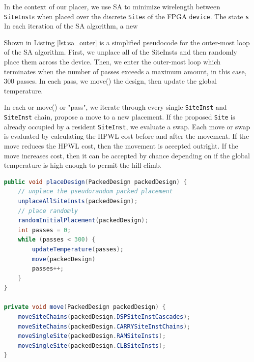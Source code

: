 %
%
%
%

In the context of our placer, we use SA to minimize wirelength between \texttt{SiteInst}s when placed over the discrete \texttt{Site}s of the FPGA \texttt{device}.
The state \texttt{s}
In each iteration of the SA algorithm, a new 

%
%
%
%

Shown in Listing \ref{lst:sa_outer} is a simplified pseudocode for the outer-most loop of the SA algorithm. 
First, we unplace all of the SiteInsts and then randomly place them across the device.
Then, we enter the outer-most loop which terminates when the number of passes exceeds a maximum amount, in this case, 300 passes. 
In each pass, we move() the design, then update the global temperature. 

In each or move() or "pass", we iterate through every single \texttt{SiteInst} and \texttt{SiteInst} chain, propose a move to a new placement. 
If the proposed \texttt{Site} is already occupied by a resident \texttt{SiteInst}, we evaluate a swap. 
Each move or swap is evaluated by calculating the HPWL cost before and after the movement.
If the move reduces the HPWL cost, then the movement is accepted outright.
If the move increases cost, then it can be accepted by chance depending on if the global temperature is high enough to permit the hill-climb.

\begin{lstlisting}[language=java, caption={SA pseudocode: outer loop}, label={lst:sa_outer}]
public void placeDesign(PackedDesign packedDesign) {
    // unplace the pseudorandom packed placement
    unplaceAllSiteInsts(packedDesign);
    // place randomly
    randomInitialPlacement(packedDesign);
    int passes = 0;
    while (passes < 300) {
        updateTemperature(passes);
        move(packedDesign)
        passes++;
    }
}

private void move(PackedDesign packedDesign) {
    moveSiteChains(packedDesign.DSPSiteInstCascades);
    moveSiteChains(packedDesign.CARRYSiteInstChains);
    moveSingleSite(packedDesign.RAMSiteInsts);
    moveSingleSite(packedDesign.CLBSiteInsts);
}
\end{lstlisting}


